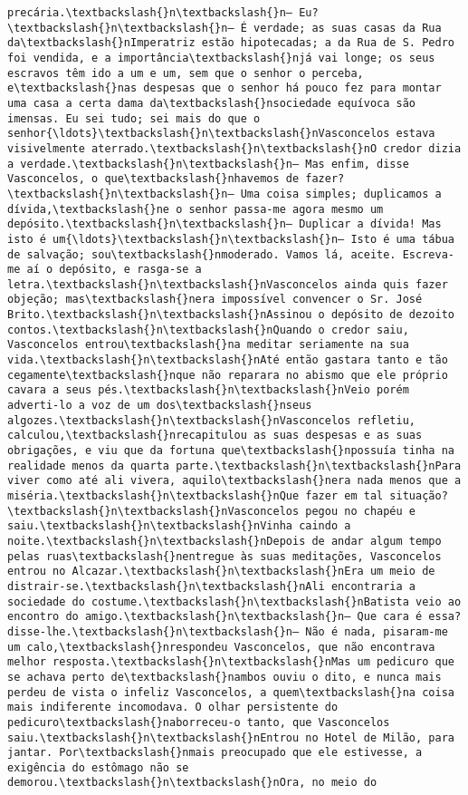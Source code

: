 \begin{Verbatim}[commandchars=\\\{\}]
precária.\textbackslash{}n\textbackslash{}n— Eu?\textbackslash{}n\textbackslash{}n— É verdade; as suas casas da Rua da\textbackslash{}nImperatriz estão hipotecadas; a da Rua de S. Pedro foi vendida, e a importância\textbackslash{}njá vai longe; os seus escravos têm ido a um e um, sem que o senhor o perceba, e\textbackslash{}nas despesas que o senhor há pouco fez para montar uma casa a certa dama da\textbackslash{}nsociedade equívoca são imensas. Eu sei tudo; sei mais do que o senhor{\ldots}\textbackslash{}n\textbackslash{}nVasconcelos estava visivelmente aterrado.\textbackslash{}n\textbackslash{}nO credor dizia a verdade.\textbackslash{}n\textbackslash{}n— Mas enfim, disse Vasconcelos, o que\textbackslash{}nhavemos de fazer?\textbackslash{}n\textbackslash{}n— Uma coisa simples; duplicamos a dívida,\textbackslash{}ne o senhor passa-me agora mesmo um depósito.\textbackslash{}n\textbackslash{}n— Duplicar a dívida! Mas isto é um{\ldots}\textbackslash{}n\textbackslash{}n— Isto é uma tábua de salvação; sou\textbackslash{}nmoderado. Vamos lá, aceite. Escreva-me aí o depósito, e rasga-se a letra.\textbackslash{}n\textbackslash{}nVasconcelos ainda quis fazer objeção; mas\textbackslash{}nera impossível convencer o Sr. José Brito.\textbackslash{}n\textbackslash{}nAssinou o depósito de dezoito contos.\textbackslash{}n\textbackslash{}nQuando o credor saiu, Vasconcelos entrou\textbackslash{}na meditar seriamente na sua vida.\textbackslash{}n\textbackslash{}nAté então gastara tanto e tão cegamente\textbackslash{}nque não reparara no abismo que ele próprio cavara a seus pés.\textbackslash{}n\textbackslash{}nVeio porém adverti-lo a voz de um dos\textbackslash{}nseus algozes.\textbackslash{}n\textbackslash{}nVasconcelos refletiu, calculou,\textbackslash{}nrecapitulou as suas despesas e as suas obrigações, e viu que da fortuna que\textbackslash{}npossuía tinha na realidade menos da quarta parte.\textbackslash{}n\textbackslash{}nPara viver como até ali vivera, aquilo\textbackslash{}nera nada menos que a miséria.\textbackslash{}n\textbackslash{}nQue fazer em tal situação?\textbackslash{}n\textbackslash{}nVasconcelos pegou no chapéu e saiu.\textbackslash{}n\textbackslash{}nVinha caindo a noite.\textbackslash{}n\textbackslash{}nDepois de andar algum tempo pelas ruas\textbackslash{}nentregue às suas meditações, Vasconcelos entrou no Alcazar.\textbackslash{}n\textbackslash{}nEra um meio de distrair-se.\textbackslash{}n\textbackslash{}nAli encontraria a sociedade do costume.\textbackslash{}n\textbackslash{}nBatista veio ao encontro do amigo.\textbackslash{}n\textbackslash{}n— Que cara é essa? disse-lhe.\textbackslash{}n\textbackslash{}n— Não é nada, pisaram-me um calo,\textbackslash{}nrespondeu Vasconcelos, que não encontrava melhor resposta.\textbackslash{}n\textbackslash{}nMas um pedicuro que se achava perto de\textbackslash{}nambos ouviu o dito, e nunca mais perdeu de vista o infeliz Vasconcelos, a quem\textbackslash{}na coisa mais indiferente incomodava. O olhar persistente do pedicuro\textbackslash{}naborreceu-o tanto, que Vasconcelos saiu.\textbackslash{}n\textbackslash{}nEntrou no Hotel de Milão, para jantar. Por\textbackslash{}nmais preocupado que ele estivesse, a exigência do estômago não se demorou.\textbackslash{}n\textbackslash{}nOra, no meio do 
\end{Verbatim}
